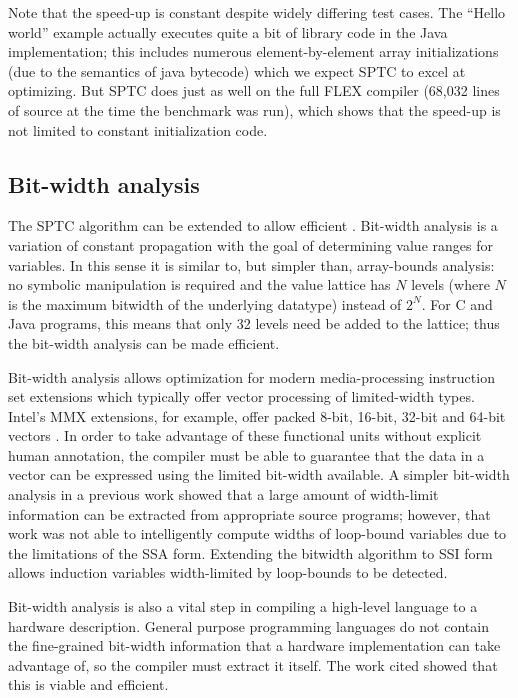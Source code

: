 \documentclass[12pt,titlepage,twoside]{article}
\begin{document}
Note that the speed-up is constant despite widely differing test
cases.  The ``Hello world'' example actually executes quite a bit of
library code in the Java implementation; this includes numerous
element-by-element array initializations (due to the semantics of
java bytecode) which we expect SPTC to excel at optimizing.  But SPTC
does just as well on the full FLEX compiler (68,032 lines of source
at the time the benchmark was run), which shows that the speed-up is
not limited to constant initialization code.

\subsection{Bit-width analysis}\label{sec:bitwidth}
The SPTC algorithm can be extended to allow efficient
.  Bit-width analysis is a variation of
constant propagation with the goal of determining value ranges for
variables.  In this sense it is similar to, but simpler than,
array-bounds analysis: no symbolic manipulation is required and the
value lattice has $N$ levels (where $N$ is the maximum bitwidth of the
underlying datatype) instead of $2^N$.  For C and Java programs, this
means that only 32 levels need be added to the lattice; thus the
bit-width analysis can be made efficient.

Bit-width analysis allows optimization for modern media-processing
instruction set extensions which typically offer vector processing of
limited-width types. Intel's MMX extensions, for example, offer packed
8-bit, 16-bit, 32-bit and 64-bit vectors \cite{peleg97:mmx}.  In order
to take advantage of these functional units without explicit human
annotation, the compiler must be able to guarantee that the data in a
vector can be expressed using the limited bit-width available.  A
simpler bit-width analysis in a previous work \cite{ananian:siliconc}
showed that a large amount of width-limit information can be extracted
from appropriate source programs; however, that work was not able to
intelligently compute widths of loop-bound variables due to the
limitations of the SSA form.  Extending the bitwidth algorithm to SSI
form allows induction variables width-limited by loop-bounds to be
detected.

Bit-width analysis is also a vital step in compiling a high-level
language to a hardware description.  General purpose programming
languages do not contain the fine-grained bit-width information that a
hardware implementation can take advantage of, so the compiler must
extract it itself.  The work cited showed that this is viable
and efficient.
\end{document}
